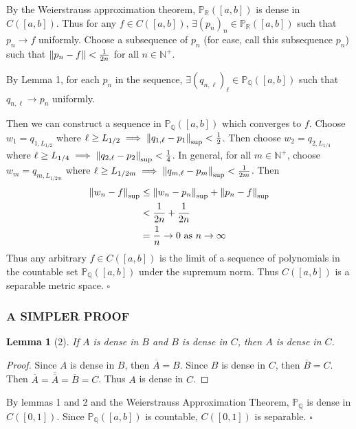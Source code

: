 \documentclass[12pt]{article}
\theoremstyle{plain}
\newtheorem*{lemma*}{Lemma}
\begin{document}
By the Weierstrauss approximation theorem, $\mathbb{P}_{\mathbb{R}}([a,b])$ is dense in $C([a,b])$.  Thus for any $f \in C([a,b])$, $\exists (p_n)_n \in \mathbb{P}_{\mathbb{R}}([a,b])$ such that $p_n \rightarrow f$ uniformly.  Choose a subsequence of $p_n$ (for ease, call this subsequence $p_n$) such that $\norm{p_n - f} < \frac{1}{2n}$ for all $n \in\mathbb{N}^+$.

By Lemma 1, for each $p_n$ in the sequence, $\exists (q_{n,\ell})_\ell \in \mathbb{P}_{\mathbb{Q}}([a,b])$ such that $q_{n,\ell} \rightarrow p_n$ uniformly.

Then we can construct a sequence in $\mathbb{P}_{\mathbb{Q}}([a,b])$ which converges to $f$.  Choose $w_1 = q_{1,L_{1/2}}$ where $\ell \geq L_{1/2} \implies \norm{q_{1,\ell} - p_1}_{\text{sup}} < \frac{1}{2}$.  Then choose $w_2 = q_{2,L_{1/4}}$ where $\ell \geq L_{1/4} \implies \norm{q_{2,\ell} - p_2}_{\text{sup}} < \frac{1}{4}$.  In general, for all $m\in\mathbb{N}^+$, choose $w_m = q_{m,L_{1/2m}}$ where $\ell \geq L_{1/2m} \implies \norm{q_{m,\ell} - p_m}_{\text{sup}} < \frac{1}{2m}$.  Then
\begin{align*}
    \norm{w_n - f}_{\text{sup}} &\leq \norm{w_n - p_n}_{\text{sup}} + \norm{p_n - f}_{\text{sup}} \\
    &< \frac{1}{2n} + \frac{1}{2n} \\
    &= \frac{1}{n} \rightarrow 0 \text{ as } n\rightarrow\infty
\end{align*}
Thus any arbitrary $f \in C([a,b])$ is the limit of a sequence of polynomials in the countable set $\mathbb{P}_\mathbb{Q}([a,b])$ under the supremum norm.  Thus $C([a,b])$ is a separable metric space. \hfill $\square$ \\

\subsubsection*{A SIMPLER PROOF}
\begin{lemma*}[2]
    If $A$ is dense in $B$ and $B$ is dense in $C$, then $A$ is dense in $C$.
\end{lemma*}
\begin{proof}
    Since $A$ is dense in $B$, then $\overline{A} = B$.  Since $B$ is dense in $C$, then $\overline{B} = C$.  Then $\overline{A} = \overline{\overline{A}} = \overline{B} = C$.  Thus $A$ is dense in $C$.
\end{proof}
By lemmas 1 and 2 and the Weierstrauss Approximation Theorem, $\mathbb{P}_\mathbb{Q}$ is dense in $C([0,1])$.  Since $\mathbb{P}_\mathbb{Q}([a,b])$ is countable, $C([0,1])$ is separable. \hfill $\square$
\end{document}

